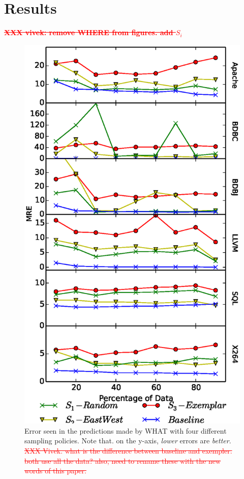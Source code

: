 \documentclass{sig-alternative}
\begin{document}
\section{Results}

\textcolor{red}{\st{\bf XXX vivek: remove WHERE from figures. add $S_i$}}

\begin{figure}[!t]
\includegraphics[width=0.9\linewidth]{Figures/SamplingAccuracy.eps}
\caption{Error seen in the predictions made by WHAT with four different
sampling policies. Note that. on the y-axis,  {\em lower} errors are {\em better}. 
\textcolor{red}{\st{XXX Vivek. what is the difference between baseline and exempler. both use all the data?
also, need to rename these with the new words of this paper.}}}\label{fig:sampling_accuracy}
\end{figure}
\end{document}
